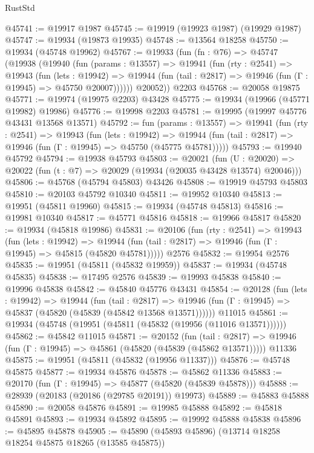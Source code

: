\begin{lexlean}{RustStd}
\begin{coremodule}
@45741 := @19917 @1987
@45745 := @19919 (@19923 @1987) (@19929 @1987)
@45747 := @19934 (@19873 @19935)
@45748 := @13564 @18258
@45750 := @19934 (@45748 @19962)
@45767 := @19933
    (fun (fn : @76) =>
    @45747
      (@19938
        (@19940
          (fun (params : @13557) =>
          @19941
            (fun (rty : @2541) =>
            @19943
              (fun (lets : @19942) =>
              @19944 (fun (tail : @2817) => @19946 (fun (Γ : @19945) => @45750 @20007))))))
        @20052))
    @2203
@45768 := @20058 @19875
@45771 := @19974 (@19975 @2203) @43428
@45775 := @19934 (@19966 (@45771 @19982) @19986)
@45776 := @19998 @2203
@45781 := @19995 (@19997 @45776 @43431 @13568 @13571)
@45792 := fun (params : @13557) =>
  @19941
    (fun (rty : @2541) =>
    @19943
      (fun (lets : @19942) =>
      @19944 (fun (tail : @2817) => @19946 (fun (Γ : @19945) => @45750 (@45775 @45781)))))
@45793 := @19940 @45792
@45794 := @19938 @45793
@45803 := @20021
    (fun (U : @20020) => @20022 (fun (t : @7) => @20029 (@19934 (@20035 @43428 @13574) @20046)))
@45806 := @45768 (@45794 @45803) @43426
@45808 := @19919 @45793 @45803
@45810 := @20103 @45792 @10340
@45811 := @19952 @10340
@45813 := @19951 (@45811 @19960)
@45815 := @19934 (@45748 @45813)
@45816 := @19981 @10340
@45817 := @45771 @45816
@45818 := @19966 @45817
@45820 := @19934 (@45818 @19986)
@45831 := @20106
    (fun (rty : @2541) =>
    @19943
      (fun (lets : @19942) =>
      @19944 (fun (tail : @2817) => @19946 (fun (Γ : @19945) => @45815 (@45820 @45781)))))
    @2576
@45832 := @19954 @2576
@45835 := @19951 (@45811 (@45832 @19959))
@45837 := @19934 (@45748 @45835)
@45838 := @17495 @2576
@45839 := @19993 @45838
@45840 := @19996 @45838
@45842 := @45840 @45776 @43431
@45854 := @20128
    (fun (lets : @19942) =>
    @19944
      (fun (tail : @2817) =>
      @19946 (fun (Γ : @19945) => @45837 (@45820 (@45839 (@45842 @13568 @13571))))))
    @11015
@45861 := @19934 (@45748 (@19951 (@45811 (@45832 (@19956 (@11016 @13571))))))
@45862 := @45842 @11015
@45871 := @20152
    (fun (tail : @2817) => @19946 (fun (Γ : @19945) => @45861 (@45820 (@45839 (@45862 @13571)))))
    @11336
@45875 := @19951 (@45811 (@45832 (@19956 @11337)))
@45876 := @45748 @45875
@45877 := @19934 @45876
@45878 := @45862 @11336
@45883 := @20170 (fun (Γ : @19945) => @45877 (@45820 (@45839 @45878)))
@45888 := @28939 (@20183 (@20186 (@29785 @20191)) @19973)
@45889 := @45883 @45888
@45890 := @20058 @45876
@45891 := @19985 @45888
@45892 := @45818 @45891
@45893 := @19934 @45892
@45895 := @19992 @45888 @45838
@45896 := @45895 @45878
@45905 := @45890 (@45893 @45896) (@13714 @18258 @18254 @45875 @18265 (@13585 @45875))

\end{coremodule}
\end{lexlean}
